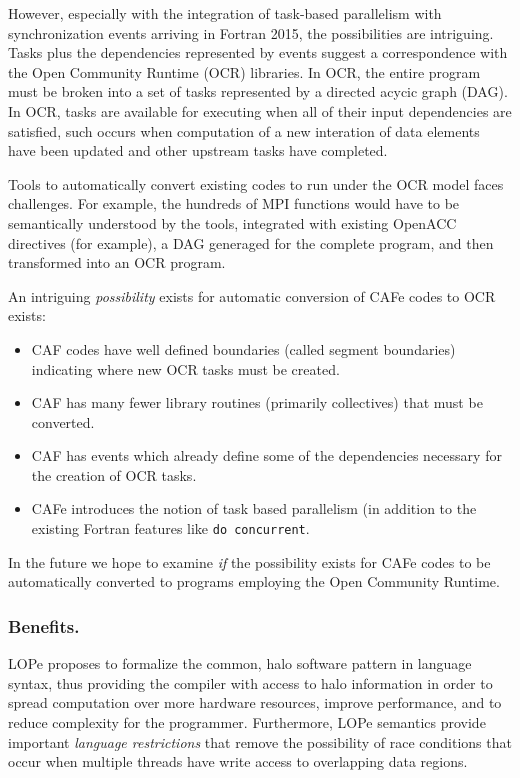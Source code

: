 However, especially with the integration of task-based parallelism with synchronization
events arriving in Fortran 2015, the possibilities are intriguing.  Tasks plus the
dependencies represented by events suggest a correspondence with the Open Community
Runtime (OCR) libraries.  In OCR, the entire program must be broken into a set of tasks
represented by a directed acycic graph (DAG).  In OCR, tasks are available for executing
when all of their input dependencies are satisfied, such occurs when computation of a new
interation of data elements have been updated and other upstream tasks have completed.

Tools to automatically convert existing codes to run under the OCR model faces challenges.  For
example, the hundreds of MPI functions would have to be semantically understood by the tools,
integrated with existing OpenACC directives (for example), a DAG generaged for the complete
program, and then transformed into an OCR program.

An intriguing \emph{possibility} exists for automatic conversion of CAFe codes to OCR exists:
\begin{itemize}
\item
  CAF codes have well defined boundaries (called segment boundaries) indicating where new
  OCR tasks must be created.
\item
  CAF has many fewer library routines (primarily collectives) that must be converted.
\item
  CAF has events which already define some of the dependencies necessary for the creation
  of OCR tasks.
\item
  CAFe introduces the notion of task based parallelism (in addition to the existing
  Fortran features like \texttt{do concurrent}.
\end{itemize}

In the future we hope to examine \emph{if} the possibility exists for CAFe codes to be
automatically converted to programs employing the Open Community Runtime.

\begin{comment}
These choices often hide the opportunity for
optimizations by the compiler \cite{Dubey:2014:SSC:2686745.2686756}.
\end{comment}

%
%


\subsubsection{Benefits.}
LOPe proposes to formalize the common, halo software pattern in language syntax, thus providing the
compiler with access to halo information in order to spread computation over more hardware
resources, improve performance, and to reduce complexity for the programmer.  Furthermore, LOPe
semantics provide important \emph{language restrictions} that remove the possibility of race conditions
that occur when multiple threads have write access to overlapping data regions.

